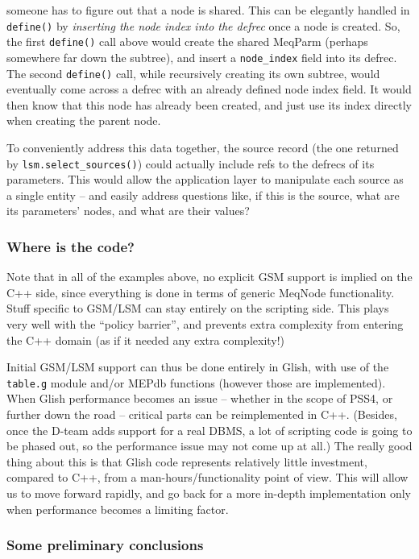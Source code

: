 \documentclass[10pt]{article}
\begin{document}
\noindent someone has to figure out that a node is shared. This can be
elegantly handled in {\tt define()} by {\em inserting the node index into the
defrec} once a node is created. So, the first {\tt define()} call above would
create the shared MeqParm (perhaps somewhere far down the subtree), and insert
a {\tt node\_index} field into its defrec. The second {\tt define()} call,
while recursively creating its own subtree, would eventually come across a
defrec with an already defined node index field. It would then know that this
node has already been created, and just use its index directly when creating
the parent node.

To conveniently address this data together, the source record (the one returned
by {\tt lsm.select\_sources()}) could actually include refs to the defrecs of
its parameters. This would allow the application layer to manipulate each
source as a single entity -- and easily address questions like, if this is the
source, what are its parameters' nodes, and what are their values?

\subsubsection{Where is the code?}

Note that in all of the examples above, no explicit GSM support is implied on
the C++ side, since everything is done in terms of generic MeqNode
functionality. Stuff specific to GSM/LSM can stay entirely on the scripting
side. This plays very well with the ``policy barrier'', and prevents extra
complexity from entering the C++ domain (as if it needed any extra complexity!)

Initial GSM/LSM support can thus be done entirely in Glish, with use of the
{\tt table.g} module and/or MEPdb functions (however those are
implemented). When Glish performance becomes an issue -- whether in the scope
of PSS4, or  further down the road -- critical parts can be reimplemented in
C++. (Besides, once the D-team adds support for a real DBMS, a lot of scripting
code is going to be phased out, so the performance issue may not come up at
all.) The really good thing about this is that Glish code represents relatively
little investment, compared to C++, from a man-hours/functionality point of
view. This will allow us to move forward rapidly, and go back for a more
in-depth implementation only when performance becomes a limiting factor.

\subsubsection{Some preliminary conclusions}
\end{document}
